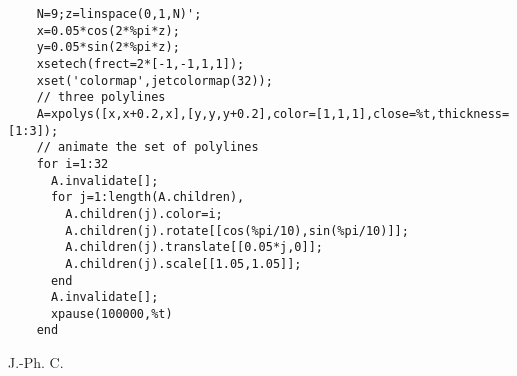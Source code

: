 \begin{examples}
  \begin{Verbatim}
    N=9;z=linspace(0,1,N)';
    x=0.05*cos(2*%pi*z);
    y=0.05*sin(2*%pi*z);
    xsetech(frect=2*[-1,-1,1,1]);
    xset('colormap',jetcolormap(32));
    // three polylines
    A=xpolys([x,x+0.2,x],[y,y,y+0.2],color=[1,1,1],close=%t,thickness=[1:3]);
    // animate the set of polylines
    for i=1:32
      A.invalidate[];
      for j=1:length(A.children),
        A.children(j).color=i;
        A.children(j).rotate[[cos(%pi/10),sin(%pi/10)]];
        A.children(j).translate[[0.05*j,0]];
        A.children(j).scale[[1.05,1.05]];
      end
      A.invalidate[];
      xpause(100000,%t)
    end
  \end{Verbatim}
\end{examples}
\begin{manseealso}
    
\end{manseealso}
\begin{authors}
  J.-Ph. C.
\end{authors}
